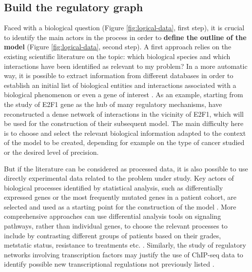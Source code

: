 \documentclass[a4paper,12pt,twoside,onecolumn,openright,final,oldfontcommands]{memoir}
\begin{document}
\subsection{Build the regulatory
graph}\label{build-the-regulatory-graph}

Faced with a biological question (Figure \ref{fig:logical-data}, first
step), it is crucial to identify the main actors in the process in order
to \textbf{define the outline of the model} (Figure
\ref{fig:logical-data}, second step). A first approach relies on the
existing scientific literature on the topic: which biological species
and which interactions have been identified as relevant to my problem?
In a more automatic way, it is possible to extract information from
different databases in order to establish an initial list of biological
entities and interactions associated with a biological phenomenon or
even a gene of interest \citep{kanehisa2012kegg, perfetto2016signor}. As
an example, starting from the study of E2F1 gene as the hub of many
regulatory mechanisms, \citet{khan2017unraveling} have reconstructed a
dense network of interactions in the vicinity of E2F1, which will be
used for the construction of their subsequent model. The main difficulty
here is to choose and select the relevant biological information adapted
to the context of the model to be created, depending for example on the
type of cancer studied or the desired level of precision.

But if the literature can be considered as processed data, it is also
possible to use directly experimental data related to the problem under
study. Key actors of biological processes identified by statistical
analysis, such as differentially expressed genes or the most frequently
mutated genes in a patient cohort, are selected and used as a starting
point for the construction of the model \citep{remy2015modeling}. More
comprehensive approaches can use differential analysis tools on
signaling pathways, rather than individual genes, to choose the relevant
processes to include by contrasting different groups of patients based
on their grades, metstatic status, resistance to treatments etc.
\citep{martignetti2016roma, montagud2017conceptual}. Similarly, the
study of regulatory networks involving transcription factors may justify
the use of ChIP-seq data to identify possible new transcriptional
regulations not previously listed \citep{collombet2017logical}.
\end{document}
